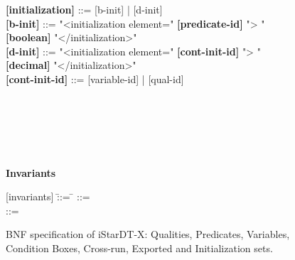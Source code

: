 \begin{figure}[hp!]
\begin{tcolorbox}[title=iStar-DT-X Grammar,colbacktitle=orange!40!white,coltitle=black,fonttitle=\bfseries,adjusted title=iStarDT-X Grammar (3/3),halign title=flush center]
\begin{scriptsize}
\begin{scriptsize}
\begin{tabbing}
\textbf{[initialization]} \> ::= [b-init] | [d-init] \\
\textbf{[b-init]} \> ::= "<initialization element=" \textbf{[predicate-id]} "> " \\\>\> \textbf{[boolean]} "</initialization>" \\
\textbf{[d-init]} \> ::= "<initialization element=" \textbf{[cont-init-id]} "> " \\\>\> \textbf{[decimal]} "</initialization>" \\
\textbf{[cont-init-id]} \> ::= [variable-id] | [qual-id] \\
\red{\textbf{[definitions]}}\>  \\
\red{\textbf{[definition]}}\>  \\
\red{[definiendum]} \>  \\ 
\>\>  \\
\red{\textbf{[definiens]}}\>  \\
\end{tabbing}
\end{scriptsize}
\rmfamily

\begin{footnotesize}
\textbf{Invariants}
\end{footnotesize}
\ttfamily
\vspace{-3mm}
\begin{scriptsize}
\begin{tabbing}
{}[invariants] \= ::= \= \kill
\red{{}[invariants]} \> ::= \\
\red{{}[invariant]} \> ::= \\
\end{tabbing}

\end{scriptsize}

\rmfamily


\end{scriptsize}
\end{tcolorbox}
\caption{BNF specification of iStarDT-X: Qualities, Predicates, Variables, Condition Boxes, Cross-run, Exported and Initialization sets.}\label{fig:iStarDT-X-Qualities}
\end{figure}
